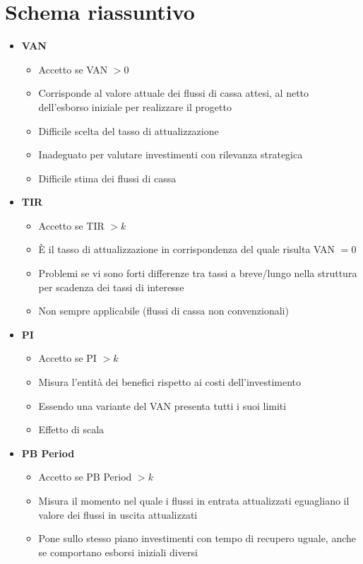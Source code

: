 \section{Schema riassuntivo}
\begin{itemize}
	\item \textbf{VAN}
	\begin{itemize}
		\item Accetto se VAN $> 0$
		\item Corrisponde al valore attuale dei flussi di cassa
		attesi, al netto dell’esborso iniziale per realizzare
il progetto
		\item Difficile scelta del tasso di attualizzazione
		\item Inadeguato per valutare investimenti con
rilevanza strategica
		\item Difficile stima dei flussi di cassa
	\end{itemize}
	\item \textbf{TIR}
	\begin{itemize}
		\item Accetto se TIR $> k$
		\item È il tasso di attualizzazione in corrispondenza del
quale risulta VAN $=0$
		\item Problemi se vi sono forti differenze tra tassi a breve/lungo nella struttura per scadenza dei tassi
di interesse
		\item Non sempre applicabile (flussi di cassa non
convenzionali)
	\end{itemize}
	\item \textbf{PI}
	\begin{itemize}
		\item Accetto se PI $> k$
		\item Misura l’entità dei benefici rispetto ai costi
		dell’investimento
		\item Essendo una variante del VAN presenta tutti i
		suoi limiti
		\item Effetto di scala
	\end{itemize}
	\item \textbf{PB Period}
	\begin{itemize}
		\item Accetto se PB Period $> k$
		\item Misura il momento nel quale i flussi in entrata
		attualizzati eguagliano il valore dei flussi in uscita
attualizzati
		\item Pone sullo stesso piano investimenti con tempo
		di recupero uguale, anche se comportano
esborsi iniziali diversi
	\end{itemize}
\end{itemize}